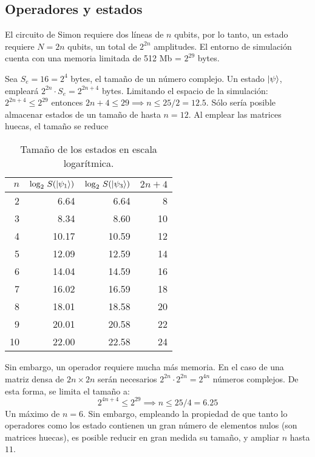 \begin{ejemplo}

\subsection{Operadores y estados}

El circuito de Simon requiere dos líneas de $n$ qubits, por lo tanto, un estado 
requiere $N=2n$ qubits, un total de $2^{2n}$ amplitudes.
El entorno de simulación cuenta con una memoria limitada de 512 Mb = $2^{29}$ 
bytes.

Sea $S_e = 16 = 2^4$ bytes, el tamaño de un número complejo. Un estado 
$\ket{\psi}$, empleará $2^{2n}\cdot S_e = 2^{2n+4}$ bytes. Limitando el espacio 
de la simulación: $2^{2n+4} \leq 2^{29}$ entonces $2n+4 \leq 29 \implies n \leq 
25/2 = 12.5$. Sólo sería posible almacenar estados de un tamaño de hasta $n=12$.
Al emplear las matrices huecas, el tamaño se reduce

\begin{table}[h]
	\centering
	\begin{tabular}{*{4}{r}}
		\toprule
		$n$ & $\log_2 \, S(\ket{\psi_1})$ & $\log_2 \, S(\ket{\psi_3})$ & $2n+4$ \\
		\midrule
		2 	& 6.64	& 6.64	& 8\\
		3 	& 8.34	& 8.60	& 10\\
		4 	& 10.17	& 10.59	& 12\\
		5 	& 12.09	& 12.59	& 14\\
		6 	& 14.04	& 14.59	& 16\\
		7 	& 16.02	& 16.59	& 18\\
		8 	& 18.01	& 18.58	& 20\\
		9 	& 20.01	& 20.58	& 22\\
		10 	& 22.00	& 22.58	& 24\\
		\bottomrule
	\end{tabular}
	\caption{Tamaño de los estados en escala logarítmica.}
\end{table}

Sin embargo, un operador requiere mucha más memoria. En el caso de una matriz 
densa de $2n \times 2n$ serán necesarios $2^{2n} \cdot 2^{2n} = 2^{4n}$ números 
complejos. De esta forma, se limita el tamaño a:
$$2^{4n+4} \leq 2^{29} \implies n \leq 25/4 = 6.25 $$
Un máximo de $n = 6$. Sin embargo, empleando la propiedad de que tanto lo 
operadores como los estado contienen un gran número de elementos nulos (son 
matrices huecas), es posible reducir en gran medida su tamaño, y ampliar $n$ 
hasta $11$.


\end{ejemplo}
